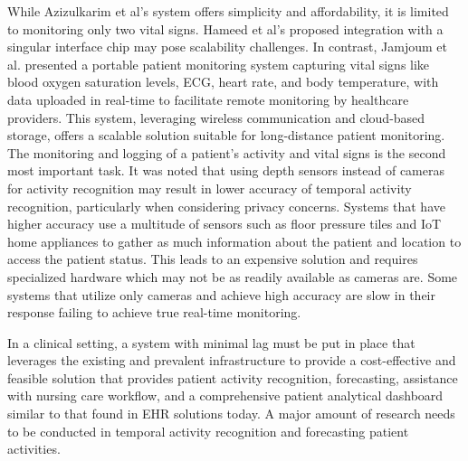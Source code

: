 While Azizulkarim et al's system offers simplicity and affordability, it is limited to monitoring only two vital signs. Hameed et al's proposed integration with a singular interface chip may pose scalability challenges. In contrast, Jamjoum et al. presented a portable patient monitoring system capturing vital signs like blood oxygen saturation levels, ECG, heart rate, and body temperature, with data uploaded in real-time to facilitate remote monitoring by healthcare providers. This system, leveraging wireless communication and cloud-based storage, offers a scalable solution suitable for long-distance patient monitoring.
The monitoring and logging of a patient's activity and vital signs is the second most important task. It was noted that using depth sensors instead of cameras for activity recognition may result in lower accuracy of temporal activity recognition, particularly when considering privacy concerns. Systems that have higher accuracy use a multitude of sensors such as floor pressure tiles and IoT home appliances to gather as much information about the patient and location to access the patient status. This leads to an expensive solution and requires specialized hardware which may not be as readily available as cameras are. Some systems that utilize only cameras and achieve high accuracy are slow in their response failing to achieve true real-time monitoring. 

In a clinical setting, a system with minimal lag must be put in place that leverages the existing and prevalent infrastructure to provide a cost-effective and feasible solution that provides patient activity recognition, forecasting, assistance with nursing care workflow, and a comprehensive patient analytical dashboard similar to that found in EHR solutions today. A major amount of research needs to be conducted in temporal activity recognition and forecasting patient activities. 



